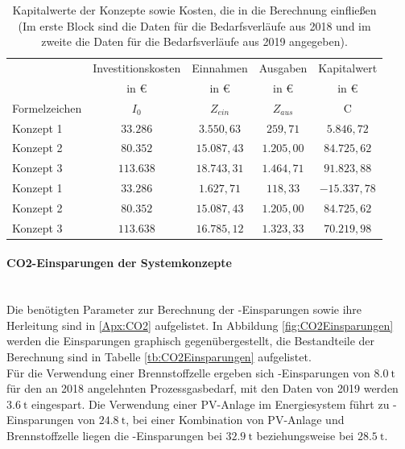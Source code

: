 \begin{table}[htb]
		\centering
		\caption{Kapitalwerte der Konzepte sowie Kosten, die in die Berechnung einfließen (Im erste Block sind die Daten für die Bedarfsverläufe aus 2018 und im zweite die Daten für die Bedarfsverläufe aus 2019 angegeben).}
		\begin{tabular}{l c c c c}
		\toprule
		 & Investitionskosten & Einnahmen & Ausgaben & Kapitalwert\\
		& in € & in € & in € & in €\\
		Formelzeichen & $I_0$ & $Z_{ein}$ & $Z_{aus}$ & C\\
		\midrule
		Konzept 1 & $ 33.286$ & $ 3.550,63$ & $  259,71$ & $ 5.846,72$\\
		Konzept 2 & $ 80.352$ & $15.087,43$ & $1.205,00$ & $84.725,62$\\
		Konzept 3 & $113.638$ & $18.743,31$ & $1.464,71$ & $91.823,88$\\
		\midrule
		Konzept 1 & $ 33.286$ & $ 1.627,71$ & $  118,33$ & $-15.337,78$\\
		Konzept 2 & $ 80.352$ & $15.087,43$ & $1.205,00$ & $ 84.725,62$\\
		Konzept 3 & $113.638$ & $16.785,12$ & $1.323,33$ & $ 70.219,98$\\
		\bottomrule
		\end{tabular}
		\label{tb:Kapitalwerte}
\end{table}	

\FloatBarrier

\paragraph{CO2-Einsparungen der Systemkonzepte}\ \\
Die benötigten Parameter zur Berechnung der -Einsparungen sowie ihre Herleitung sind in \ref{Apx:CO2} aufgelistet. In Abbildung \ref{fig:CO2Einsparungen} werden die Einsparungen graphisch gegenübergestellt, die Bestandteile der Berechnung sind in Tabelle \ref{tb:CO2Einsparungen} aufgelistet.\\

Für die Verwendung einer Brennstoffzelle ergeben sich -Einsparungen von $\SI{8,0}{\tonne}$ für den an 2018 angelehnten Prozessgasbedarf, mit den Daten von 2019 werden $\SI{3,6}{\tonne}$  eingespart. Die Verwendung einer PV-Anlage im Energiesystem führt zu -Einsparungen von $\SI{24,8}{\tonne}$, bei einer Kombination von PV-Anlage und Brennstoffzelle liegen die -Einsparungen bei $\SI{32,9}{\tonne}$ beziehungsweise bei $\SI{28,5}{\tonne}$.\\

